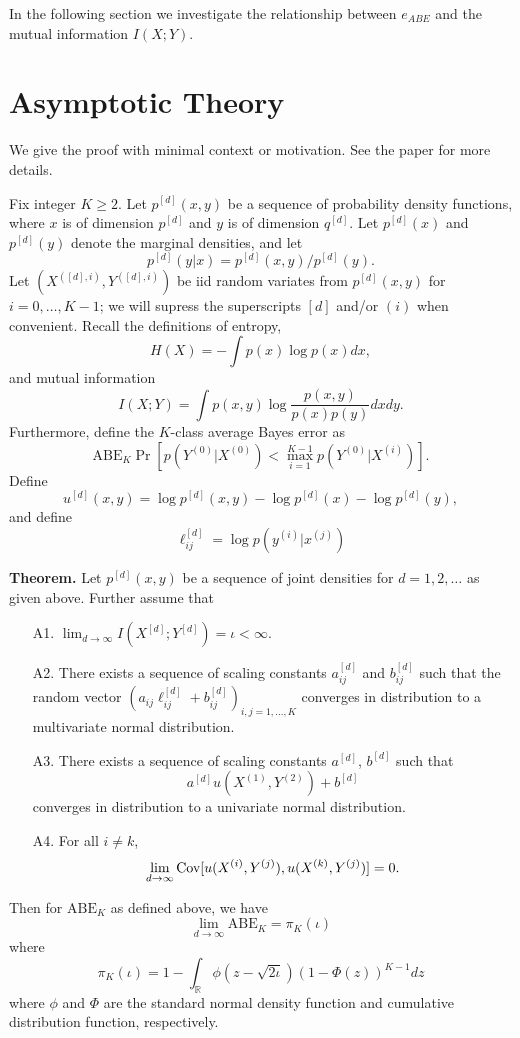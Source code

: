 \documentclass[12pt]{article}
\begin{document}
In the following section we investigate the relationship between $e_{ABE}$ and the mutual information $I(X; Y)$.

\section{Asymptotic Theory}

We give the proof with minimal context or motivation.  See the paper
for more details.

Fix integer $K \geq 2$.  Let $p^{[d]}(x,y)$ be a sequence of
probability density functions, where $x$ is of dimension $p^{[d]}$ and
$y$ is of dimension $q^{[d]}$.  Let $p^{[d]}(x)$ and $p^{[d]}(y)$
denote the marginal densities, and let
\[
p^{[d]}(y|x) = p^{[d]}(x, y)/p^{[d]}(y).\]
 Let $(X^{([d], i)}, Y^{([d], i)})$ be
iid random variates from $p^{[d]}(x, y)$ for $i = 0, \hdots, K-1$; we will supress the
superscripts $[d]$ and/or $(i)$ when convenient.  Recall the definitions of
entropy,
\[
H(X) = -\int p(x) \log p(x) dx,
\]
and mutual information
\[
I(X; Y) = \int p(x, y) \log \frac{p(x, y)}{p(x)p(y)} dx dy.
\]
Furthermore, define the $K$-class average Bayes error as
\[
\text{ABE}_K \Pr[p(Y^{(0)}|X^{(0)}) < \max_{i = 1}^{K-1} p(Y^{(0)}|X^{(i)})].
\]
Define
\[
u^{[d]}(x, y) = \log p^{[d]}(x, y) - \log p^{[d]}(x) - \log p^{[d]}(y),
\]
and define
\[
\ell_{ij}^{[d]} = \log p(y^{(i)}|x^{(j)})
\]


\textbf{Theorem.} Let $p^{[d]}(x, y)$ be a sequence of joint densities
for $d = 1,2,\hdots$ as given above.  Further assume that
\begin{itemize}
\item[A1.] $\lim_{d \to \infty} I(X^{[d]}; Y^{[d]}) = \iota < \infty.$
\item[A2.] There exists a sequence of scaling constants $a_{ij}^{[d]}$
and $b_{ij}^{[d]}$ such that the random vector $(a_{ij}\ell_{ij}^{[d]} +
b_{ij}^{[d]})_{i, j = 1,\hdots, K}$ converges in distribution to a
multivariate normal distribution.
\item[A3.] There exists a sequence of scaling constants $a^{[d]}$, $b^{[d]}$ such that
\[
a^{[d]}u(X^{(1)}, Y^{(2)}) + b^{[d]}
\]
converges in distribution to a univariate normal distribution.
\item[A4.] For all $i \neq k$,
\[\lim_{d \to \infty}\text{Cov}[u(X^{(i)}, Y^{(j)}), u(X^{(k)}, Y^{(j)})] = 0.\]
\end{itemize}
Then for $\text{ABE}_K$ as defined above, we have
\[
\lim_{d \to \infty} \text{ABE}_{K} = \pi_K(\iota)
\]
where
\[
\pi_K(\iota) = 1 - \int_{\mathbb{R}} \phi(z - \sqrt{2\iota}) (1 - \Phi(z))^{K-1} dz
\]
where $\phi$ and $\Phi$ are the standard normal density function and
cumulative distribution function, respectively.
\end{document}
